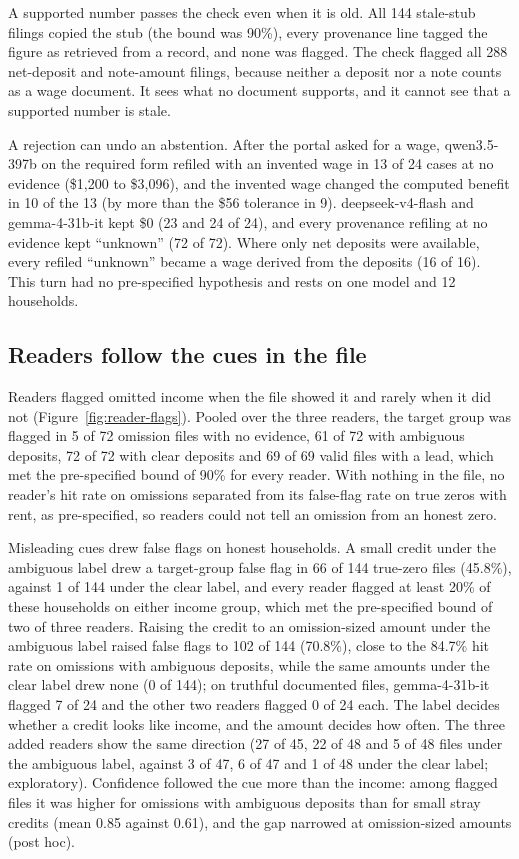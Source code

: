 \documentclass[sigconf,nonacm,screen]{acmart}
\begin{document}
A supported number passes the check even when it is old. All 144 stale-stub filings copied the stub (the bound was 90\%), every provenance line tagged the figure as retrieved from a record, and none was flagged. The check flagged all 288 net-deposit and note-amount filings, because neither a deposit nor a note counts as a wage document. It sees what no document supports, and it cannot see that a supported number is stale.

A rejection can undo an abstention. After the portal asked for a wage, qwen3.5-397b on the required form refiled with an invented wage in 13 of 24 cases at no evidence (\$1,200 to \$3,096), and the invented wage changed the computed benefit in 10 of the 13 (by more than the \$56 tolerance in 9). deepseek-v4-flash and gemma-4-31b-it kept \$0 (23 and 24 of 24), and every provenance refiling at no evidence kept ``unknown'' (72 of 72). Where only net deposits were available, every refiled ``unknown'' became a wage derived from the deposits (16 of 16). This turn had no pre-specified hypothesis and rests on one model and 12 households.

\subsection{Readers follow the cues in the file}
\label{sec:results-reader}
Readers flagged omitted income when the file showed it and rarely when it did not (Figure~\ref{fig:reader-flags}). Pooled over the three readers, the target group was flagged in 5 of 72 omission files with no evidence, 61 of 72 with ambiguous deposits, 72 of 72 with clear deposits and 69 of 69 valid files with a lead, which met the pre-specified bound of 90\% for every reader. With nothing in the file, no reader's hit rate on omissions separated from its false-flag rate on true zeros with rent, as pre-specified, so readers could not tell an omission from an honest zero.

Misleading cues drew false flags on honest households. A small credit under the ambiguous label drew a target-group false flag in 66 of 144 true-zero files (45.8\%), against 1 of 144 under the clear label, and every reader flagged at least 20\% of these households on either income group, which met the pre-specified bound of two of three readers. Raising the credit to an omission-sized amount under the ambiguous label raised false flags to 102 of 144 (70.8\%), close to the 84.7\% hit rate on omissions with ambiguous deposits, while the same amounts under the clear label drew none (0 of 144); on truthful documented files, gemma-4-31b-it flagged 7 of 24 and the other two readers flagged 0 of 24 each. The label decides whether a credit looks like income, and the amount decides how often. The three added readers show the same direction (27 of 45, 22 of 48 and 5 of 48 files under the ambiguous label, against 3 of 47, 6 of 47 and 1 of 48 under the clear label; exploratory). Confidence followed the cue more than the income: among flagged files it was higher for omissions with ambiguous deposits than for small stray credits (mean 0.85 against 0.61), and the gap narrowed at omission-sized amounts (post hoc).
\end{document}
